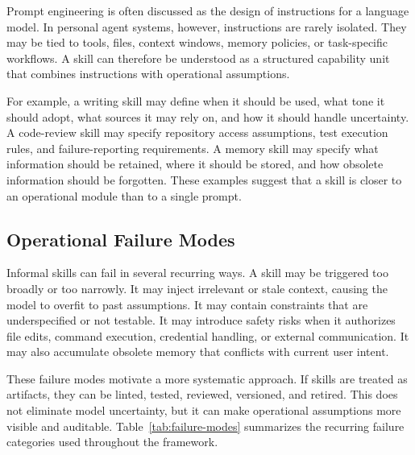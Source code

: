 \documentclass[11pt]{article}
\begin{document}
Prompt engineering is often discussed as the design of instructions for a
language model. In personal agent systems, however, instructions are rarely
isolated. They may be tied to tools, files, context windows, memory policies,
or task-specific workflows. A skill can therefore be understood as a structured
capability unit that combines instructions with operational assumptions.

For example, a writing skill may define when it should be used, what tone it
should adopt, what sources it may rely on, and how it should handle
uncertainty. A code-review skill may specify repository access assumptions, test
execution rules, and failure-reporting requirements. A memory skill may specify
what information should be retained, where it should be stored, and how
obsolete information should be forgotten. These examples suggest that a skill is
closer to an operational module than to a single prompt.

\subsection{Operational Failure Modes}

Informal skills can fail in several recurring ways. A skill may be triggered too
broadly or too narrowly. It may inject irrelevant or stale context, causing the
model to overfit to past assumptions. It may contain constraints that are
underspecified or not testable. It may introduce safety risks when it
authorizes file edits, command execution, credential handling, or external
communication. It may also accumulate obsolete memory that conflicts with
current user intent.

These failure modes motivate a more systematic approach. If skills are treated
as artifacts, they can be linted, tested, reviewed, versioned, and retired.
This does not eliminate model uncertainty, but it can make operational
assumptions more visible and auditable. Table~\ref{tab:failure-modes}
summarizes the recurring failure categories used throughout the framework.
\end{document}
